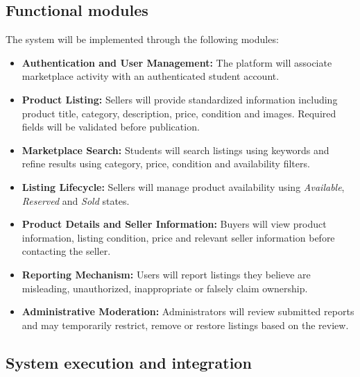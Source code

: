 \documentclass[11pt,a4paper]{article}
\begin{document}
\subsection{Functional modules}

The system will be implemented through the following modules:

\begin{itemize}

    \item \textbf{Authentication and User Management:}
    The platform will associate marketplace activity with an
    authenticated student account.

    \item \textbf{Product Listing:}
    Sellers will provide standardized information including product
    title, category, description, price, condition and images.
    Required fields will be validated before publication.

    \item \textbf{Marketplace Search:}
    Students will search listings using keywords and refine results
    using category, price, condition and availability filters.

    \item \textbf{Listing Lifecycle:}
    Sellers will manage product availability using
    \textit{Available}, \textit{Reserved} and \textit{Sold} states.

    \item \textbf{Product Details and Seller Information:}
    Buyers will view product information, listing condition, price
    and relevant seller information before contacting the seller.

    \item \textbf{Reporting Mechanism:}
    Users will report listings they believe are misleading,
    unauthorized, inappropriate or falsely claim ownership.

    \item \textbf{Administrative Moderation:}
    Administrators will review submitted reports and may temporarily
    restrict, remove or restore listings based on the review.

\end{itemize}


\subsection{System execution and integration}
\end{document}
